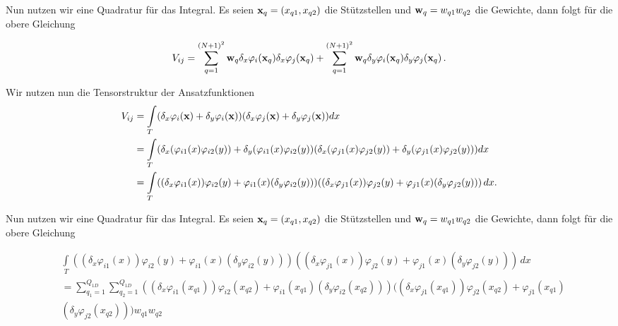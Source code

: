 Nun nutzen wir eine Quadratur für das Integral. Es seien $\bold{x}_q=(x_{q1},x_{q2})$ die Stützstellen und $\bold{w}_q=w_{q1}w_{q2}$ die Gewichte, dann folgt für die obere Gleichung

\begin{equation}
\begin{aligned}
V_{ij}  = \sum\limits_{q=1}^{(N+1)^2} \bold{w}_q \delta_x  \varphi_i(\bold{x}_q)  \delta_x \varphi_j (\bold{x}_q) + \sum\limits_{q=1}^{(N+1)^2} \bold{w}_q  \delta_y \varphi_i(\bold{x}_q)  \delta_y \varphi_j(\bold{x}_q) \, .
\end{aligned}
\end{equation}

Wir nutzen nun die Tensorstruktur der Ansatzfunktionen
\begin{equation*}
\begin{aligned}
V_{ij}&=\int\limits_{T}( \delta_x  \varphi_i(\bold{x}) + \delta_y \varphi_i(\bold{x})) ( \delta_x \varphi_j(\bold{x}) + \delta_y \varphi_j(\bold{x})) dx \\ &= \int\limits_{T}( \delta_x  (\varphi_{i1}(x) \varphi_{i2}(y)) + \delta_y (\varphi_{i1}(x) \varphi_{i2}(y)) ( \delta_x ( \varphi_{j1}(x) \varphi_{j2}(y)) + \delta_y  (\varphi_{j1}(x) \varphi_{j2}(y))) dx \\ &= \int\limits_{T}( (\delta_x  \varphi_{i1}(x)) \varphi_{i2}(y) + \varphi_{i1}(x) (\delta_y \varphi_{i2}(y))) ( (\delta_x  \varphi_{j1}(x)) \varphi_{j2}(y) +  \varphi_{j1}(x) (\delta_y \varphi_{j2}(y))) \, dx. \\
\end{aligned}
\end{equation*}

Nun nutzen wir eine Quadratur für das Integral. Es seien $\bold{x}_q=(x_{q1},x_{q2})$ die Stützstellen und $\bold{w}_q=w_{q1}w_{q2}$ die Gewichte, dann folgt für die obere Gleichung

\begin{equation*}
\begin{aligned}
&\int\limits_{T}( (\delta_x  \varphi_{i1}(x)) \varphi_{i2}(y) + \varphi_{i1}(x) (\delta_y \varphi_{i2}(y))) ( (\delta_x  \varphi_{j1}(x)) \varphi_{j2}(y) +  \varphi_{j1}(x) (\delta_y \varphi_{j2}(y))) \, dx \\ &= \sum\limits_{q_1=1}^{Q_{1D}} \sum\limits_{q_2=1}^{Q_{1D}} ( (\delta_x  \varphi_{i1}(x_{q1})) \varphi_{i2}(x_{q2}) + \varphi_{i1}(x_{q1}) (\delta_y \varphi_{i2}(x_{q2}))) ( (\delta_x  \varphi_{j1}(x_{q1})) \varphi_{j2}(x_{q2}) +  \varphi_{j1}(x_{q1}) \\ &(\delta_y \varphi_{j2}(x_{q2}))) w_{q1}w_{q2}
\end{aligned}
\end{equation*}

